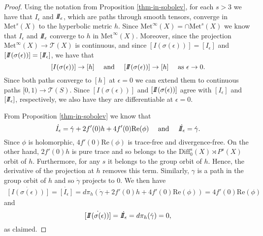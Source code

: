 \begin{proof}
Using the notation from  Proposition \ref{thm-in-sobolev}, for each $s > 3$ we have that $I_\epsilon$ and $I\!\!I_\epsilon$, which are paths through smooth tensors, converge in $\mathrm{Met}^s(X)$ to the hyperbolic metric $h$. 
Since $\mathrm{Met}^\infty(X)  = \cap \mathrm{Met}^s(X)$ we know that $I_\epsilon$ and $I\!\!I_\epsilon$ converge to $h$ in $\mathrm{Met}^\infty(X)$. 
Moreover, since the projection $\mathrm{Met}^\infty(X) \to \mathcal{T}(X)$ is continuous, and since $[I(\sigma(\epsilon))] = [I_\epsilon]$ and $[I\!\!I(\sigma(\epsilon))] = [I\!\!I_\epsilon]$, we have that
\[
[I(\sigma(\epsilon))] \to [h]
\quad \text{ and } \quad 
[I\!\!I(\sigma(\epsilon))] \to [h]
\quad \text{ as } \epsilon \to 0.
\]
Since both paths converge to $[h]$ at $\epsilon = 0$ we can extend them to continuous paths $[0,1) \to \mathcal{T}(S)$. 
Since $[I(\sigma(\epsilon))]$ and  $[I\!\!I(\sigma(\epsilon))]$ agree with $[I_\epsilon]$ and $[I\!\!I_\epsilon]$, respectively, we also have they are differentiable at $\epsilon = 0$.

From Proposition \ref{thm-in-sobolev} we know that 
\[
\dot{I_\epsilon}  = \dot{\gamma} + 2 f'(0) h + 4 f'(0) \mathrm{Re}(\phi) \quad \text{ and } \quad \dot{I\!\!I_\epsilon} = \dot{\gamma}.
\]
Since $\phi$ is holomorphic, $4 f'(0) \mathrm{Re}(\phi)$ is trace-free and divergence-free. 
On the other hand, $2 f'(0) h$ is pure trace and so belongs to the $\mathrm{Diff}_0^s(X) \rtimes P^s(X)$ orbit of $h$. Furthermore, for any $s$ it belongs to the group orbit of $h$. 
Hence, the derivative of the projection at $h$ removes this term.
Similarly, $\gamma$ is a path in the group orbit of $h$ and so $\dot{\gamma}$ projects to 0. 
We then have
\begin{align*}
\dot{[I(\sigma(\epsilon))]}
= \dot{[I_\epsilon]}
= d \pi_h (\dot{\gamma} + 2 f'(0) h + 4 f'(0) \mathrm{Re}(\phi)) 
= 4 f'(0) \mathrm{Re}(\phi)
\end{align*}
and
\[
\dot{[I\!\!I(\sigma(\epsilon))]} = \dot{I\!\!I_\epsilon} = d \pi_h (\dot{\gamma}) = 0,
\]
as claimed.
\end{proof}

